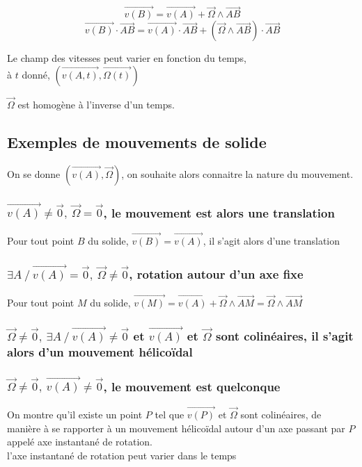 \documentclass[../main.tex]{subfile}
\begin{document}
\begin{rema}
	$$\vec{v(B)} = \vec{v(A)} + \vec{\Omega} \wedge \vec{AB}$$
	$$\vec{v(B)} \cdot \vec{AB} = \vec{v(A)}  \cdot \vec{AB}+ (\vec{\Omega} \wedge \vec{AB}) \cdot \vec{AB}$$
\end{rema}

\begin{rema}
	Le champ des vitesses peut varier en fonction du temps, \\
	à $t$ donné, $(\vec{v(A, t)}, \vec{\Omega(t)})$
\end{rema}

\begin{rema}
	$\vec{\Omega}$ est homogène à l'inverse d'un temps.
\end{rema}

\subsection{Exemples de mouvements de solide}

On se donne $(\vec{v(A)}, \vec{\Omega})$, on souhaite alors connaitre la nature du mouvement.
\subsubsection{$\vec{v(A)} \neq \vec{0}, \ \vec{\Omega} = \vec{0}$, le mouvement est alors une translation}

Pour tout point $B$ du solide, $\vec{v(B)} = \vec{v(A)}$, il s'agit alors d'une translation

\subsubsection{$\exists A \ / \ \vec{v(A)} = \vec{0}, \ \vec{\Omega} \neq \vec{0}$, rotation autour d'un axe fixe}
Pour tout point $M$ du solide, $\vec{v(M)} = \vec{v(A)} + \vec{\Omega} \wedge \vec{AM} = \vec{\Omega} \wedge \vec{AM}$


\subsubsection{$\vec{\Omega} \neq \vec{0}, \ \exists A \ / \ \vec{v(A)} \neq \vec{0}$ et $\vec{v(A)}$ et $\vec{\Omega}$ sont colinéaires, il s'agit alors d'un mouvement hélicoïdal}

\subsubsection{$\vec{\Omega} \neq \vec{0}, \ \vec{v(A)} \neq \vec{0}$, le mouvement est quelconque}
On montre qu'il existe un point $P$ tel que $\vec{v(P)}$ et $\vec{\Omega}$ sont colinéaires, de manière à se rapporter à un mouvement hélicoïdal autour d'un axe passant par $P$ appelé axe instantané de rotation.\\
l'axe instantané de rotation peut varier dans le temps
\end{document}
